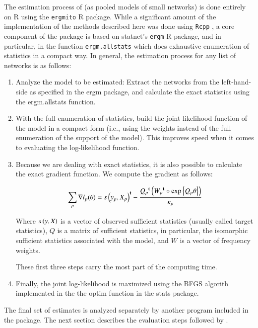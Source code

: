 \documentclass[review, nonatbib,doubleblind]{elsarticle/elsarticle}
\begin{document}
The estimation process of \ergmitos{} (as pooled models of small networks) is done entirely on R using the \texttt{ergmito} R package. While a significant amount of the implementation of the methods described here was done using \texttt{Rcpp} \cite{Eddelbuettel2011}, a core component of the package is based on statnet's \texttt{ergm} R package, and in particular, in the function \texttt{ergm.allstats} which does exhaustive enumeration of statistics in a compact way. In general, the estimation process for any list of networks is as follows:

\begin{enumerate}
    \item Analyze the model to be estimated: Extract the networks from the left-hand-side as specified in the ergm package, and calculate the exact statistics using the ergm.allstats function.
    \item With the full enumeration of statistics, build the joint likelihood function of the model in a compact form (i.e., using the weights instead of the full enumeration of the support of the model). This improves speed when it comes to evaluating the log-likelihood function.
    \item Because we are dealing with exact statistics, it is also possible to calculate the exact gradient function. We compute the gradient as follows:
    
    \begin{equation}
    \sum_{p}\nabla l_p(\theta) = {s\left(y_p, X_p\right)}^\mathbf{t} - \frac{{Q_p}^\mathbf{t}\left({W_p}^\mathbf{t} \circ \mbox{exp}\left\{Q_p \theta\right\}\right)}{\kappa_p}
    \end{equation}
    
    Where $s\left(y, X\right)$ is a vector of observed sufficient statistics (usually called target statistics), $Q$ is a matrix of sufficient statistics, in particular, the isomorphic sufficient statistics associated with the model, and $W$ is a vector of frequency weights.
    
    These first three steps carry the most part of the computing time.
    
    \item Finally, the joint log-likelihood is maximized using the BFGS algorith implemented in the the optim function in the stats package.
    
\end{enumerate}

The final set of estimates is analyzed separately by another program included in the package. The next section describes the evaluation steps followed by \ergmito{}.
\end{document}
